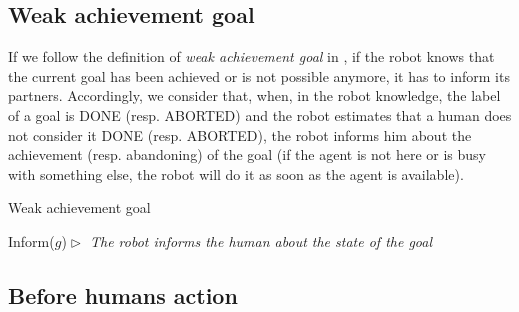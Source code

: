 \documentclass[english,a4paper,11pt,twoside]{StyleThese}
\begin{document}
\subsection{Weak achievement goal}

If we follow the definition of \textit{weak achievement goal} in \cite{cohen1991teamwork}, if the robot knows that the current goal has been achieved or is not possible anymore, it has to inform its partners. Accordingly, we consider that, when, in the robot knowledge, the label of a goal is DONE (resp. ABORTED) and the robot estimates that a human does not consider it DONE (resp. ABORTED), the robot informs him about the achievement (resp. abandoning) of the goal (if the agent is not here or is busy with something else, the robot will do it as soon as the agent is available).

\begin{algorithm}
\caption{Weak achievement goal}
\label{alg:informGoal}
\begin{algorithmic}
\STATE Inform($g$)\hfill \textit{$\vartriangleright$ The robot informs the human about the state of the goal}
\ENDIF
\end{algorithmic}
\end{algorithm} 

\subsection{Before humans action}
\end{document}
